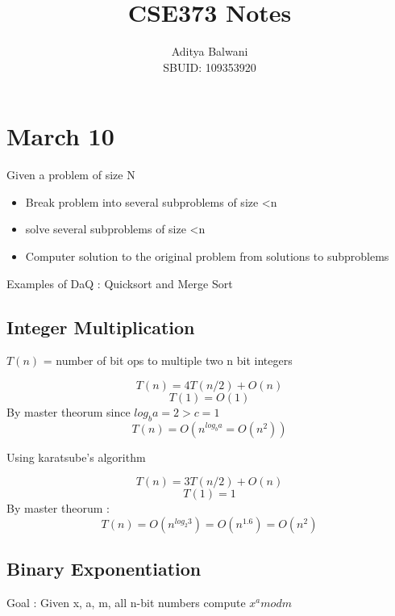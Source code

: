 \documentclass{article}
\title{\textbf{CSE373 Notes}}
\author{Aditya Balwani\\SBUID: 109353920}
\begin{document}
\maketitle
{}
\section{March 10}
    Given a problem of size N
    \begin{itemize}
        \item Break problem into several subproblems of size \textless n
        \item solve several subproblems of size \textless n
        \item Computer solution to the original problem from solutions to subproblems
    \end{itemize}

    Examples of DaQ : Quicksort and Merge Sort

    \subsection{Integer Multiplication}

        $T(n)$ = number of bit ops to multiple two n bit integers

        \[T(n) = 4T(n/2) + O(n)\]
        \[T(1) = O(1)\]
        By master theorum since $log_b a = 2 > c = 1$
        \[T(n) = O(n^{log_b a} = O(n^2))\]

        Using karatsube's algorithm

        \[T(n) = 3T(n/2) + O(n)\]
        \[T(1) = 1\]
        By master theorum :
        \[T(n) = O(n^{log_2 3}) = O(n^1.6) = O(n^2)\]

    \subsection{Binary Exponentiation}

        Goal : Given x, a, m, all n-bit numbers compute $x^a mod m$
\end{document}
